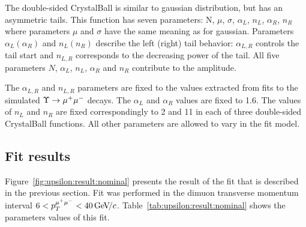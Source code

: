 The double-sided CrystalBall is similar to gaussian distribution, but has an
asymmetric tails. This function has seven parameters: N, $\mu$, $\sigma$,
$\alpha_L$, $n_L$, $\alpha_R$, $n_R$ where parameters $\mu$ and $\sigma$ have
the same meaning as for gaussian. Parameters $\alpha_L (\alpha_R)$ and $n_L
(n_R)$ describe the left (right) tail behavior: $\alpha_{L,R}$ controls the
tail start and $n_{L,R}$ corresponds to the decreasing power of the tail. All
five parameters $N$, $\alpha_L$, $n_L$, $\alpha_R$ and $n_R$ contribute to the
amplitude.



The  $\alpha_{L,R}$ and $n_{L,R}$ parameters are fixed to the values extracted
from fits to the simulated $\Upsilon \rightarrow {\ensuremath{\mu^+\mu^-}}$ decays. The $\alpha_L$ and
$\alpha_R$ values are fixed to 1.6. The values of $n_L$  and $n_R$ are fixed
correspondingly to 2 and 11 in each of three double-sided CrystalBall
functions. All other parameters are allowed to vary in the fit model.

\subsection{Fit results}
\label{sec:upsilon:result}

Figure~\ref{fig:upsilon:result:nominal} presents the result of the fit that is
described in the previous section. Fit was performed in the dimuon
transverse momentum interval $ 6 < p_T^{{\mu^+\mu^-}} < 40 {\mathrm{\,Ge\kern -0.1em V\!/}c}$.
Table~\ref{tab:upsilon:result:nominal} shows the parameters values of this fit.







